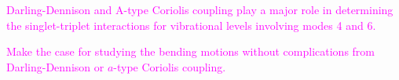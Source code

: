 \documentclass[12pt,draft]{mitthesis}
\newcommand{\POINT}[1]{\textcolor{magenta}{#1}}
\begin{document}
\POINT{Darling-Dennison and A-type Coriolis coupling play a major role
  in determining the singlet-triplet interactions for vibrational
  levels involving modes 4 and 6.}

\POINT{Make the case for studying the bending motions without
  complications from Darling-Dennison or $a$-type Coriolis coupling.}





\end{document}
